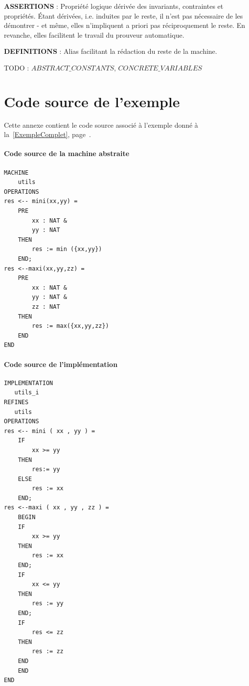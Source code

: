 \documentclass[10pt,a4paper]{article}
\begin{document}
\textbf{ASSERTIONS} : Propriété logique dérivée des invariants, contraintes et propriétés. Étant dérivées, i.e. induites par le reste, il n'est pas nécessaire de les démontrer - et même, elles n'impliquent a priori pas réciproquement le reste. En revanche, elles facilitent le travail du prouveur automatique.

\textbf{DEFINITIONS} : Alias facilitant la rédaction du reste de la machine.

TODO : $ABSTRACT\_CONSTANTS$, $CONCRETE\_VARIABLES$

\section{Code source de l'exemple}
\label{CodeSource}
Cette annexe contient le code source associé à l'exemple donné à la~\cref{ExempleComplet}, page~\pageref{ExempleComplet}.

\paragraph{Code source de la machine abstraite}
\begin{verbatim}
MACHINE
    utils
OPERATIONS
res <-- mini(xx,yy) =
    PRE
        xx : NAT &
        yy : NAT
    THEN
        res := min ({xx,yy})
    END;
res <--maxi(xx,yy,zz) =
    PRE
        xx : NAT &
        yy : NAT &
        zz : NAT
    THEN
        res := max({xx,yy,zz})
    END
END
\end{verbatim}

\paragraph{Code source de l'implémentation}
\begin{verbatim}
IMPLEMENTATION
   utils_i
REFINES
   utils
OPERATIONS
res <-- mini ( xx , yy ) =
    IF
        xx >= yy
    THEN
        res:= yy
    ELSE
        res := xx
    END;
res <--maxi ( xx , yy , zz ) =
    BEGIN
    IF
        xx >= yy
    THEN
        res := xx
    END;
    IF
        xx <= yy
    THEN
        res := yy
    END;
    IF
        res <= zz
    THEN
        res := zz
    END
    END
END
\end{verbatim}



\end{document}
